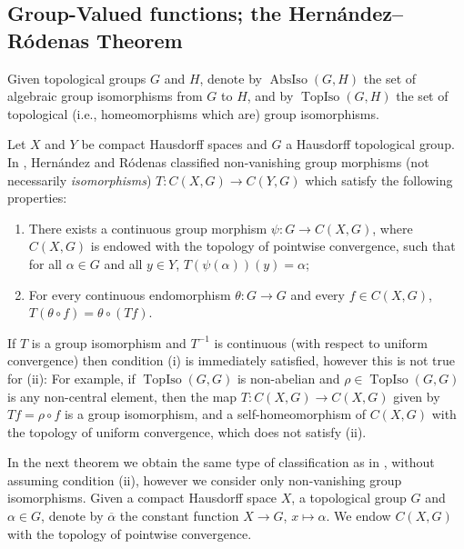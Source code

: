 \documentclass[letter,11pt]{amsart}
\theoremstyle{plain}		\newtheorem{theorem}[generalnumbering]{Theorem}
\theoremstyle{plain}		\newtheorem{corollary}[generalnumbering]{Corollary}
\theoremstyle{definition}		\newtheorem{definition}[generalnumbering]{Definition}
\theoremstyle{definition}		\newtheorem{example}[generalnumbering]{Example}
\theoremstyle{plain}		\newtheorem{proposition}[generalnumbering]{Proposition}
\theoremstyle{plain}		\newtheorem{lemma}[generalnumbering]{Lemma}
\theoremstyle{plain}    \newtheorem{plainstyle}[generalnumbering]{\namefordifferentenvironment}
\theoremstyle{plain}    \newtheorem*{plainstyle*}{\namefordifferentenvironment}
\theoremstyle{definition}    \newtheorem{definitionstyle}[generalnumbering]{\namefordifferentenvironment}
\theoremstyle{definition}    \newtheorem*{definitionstyle*}{\namefordifferentenvironment}
\begin{document}
\subsection{Group-Valued functions; the Hernández--Ródenas Theorem}

Given topological groups $G$ and $H$, denote by $\operatorname{AbsIso}(G,H)$ the set of algebraic group isomorphisms from $G$ to $H$, and by $\operatorname{TopIso}(G,H)$ the set of topological (i.e., homeomorphisms which are) group isomorphisms.

Let $X$ and $Y$ be compact Hausdorff spaces and $G$ a Hausdorff topological group. In \cite[Theorem 3.7]{MR2324919}, Hernández and Ródenas classified non-vanishing group morphisms (not necessarily \emph{isomorphisms}) $T\colon C(X,G)\to C(Y,G)$ which satisfy the following properties:
\begin{enumerate}[label=(\roman*)]
	\item There exists a continuous group morphism $\psi\colon G\to C(X,G)$, where $C(X,G)$ is endowed with the topology of pointwise convergence, such that for all $\alpha\in G$ and all $y\in Y$, $T(\psi(\alpha))(y)=\alpha$;
	\item For every continuous endomorphism $\theta\colon G\to G$ and every $f\in C(X,G)$, $T(\theta\circ f)=\theta\circ (Tf)$.
\end{enumerate}
If $T$ is a group isomorphism and $T^{-1}$ is continuous (with respect to uniform convergence) then condition (i) is immediately satisfied, however this is not true for (ii): For example, if $\operatorname{TopIso}(G,G)$ is non-abelian and $\rho\in\operatorname{TopIso}(G,G)$ is any non-central element, then the map $T\colon C(X,G)\to C(X,G)$ given by $Tf=\rho\circ f$ is a group isomorphism, and a self-homeomorphism of $C(X,G)$ with the topology of uniform convergence, which does not satisfy (ii).

In the next theorem we obtain the same type of classification as in \cite[Theorem 3.7]{MR2324919}, without assuming condition (ii), however we consider only non-vanishing group isomorphisms. Given a compact Hausdorff space $X$, a topological group $G$ and $\alpha\in G$, denote by $\overline{\alpha}$ the constant function $X\to G$, $x\mapsto \alpha$. We endow $C(X,G)$ with the topology of pointwise convergence.
\end{document}
